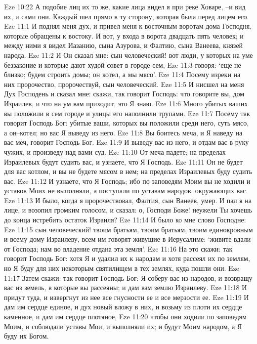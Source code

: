Eze 10:22  А подобие лиц их то же, какие лица видел я при реке Ховаре, --и вид их, и сами они. Каждый шел прямо в ту сторону, которая была перед лицем его.
Eze 11:1  И поднял меня дух, и привел меня к восточным воротам дома Господня, которые обращены к востоку. И вот, у входа в ворота двадцать пять человек; и между ними я видел Иазанию, сына Азурова, и Фалтию, сына Ванеева, князей народа.
Eze 11:2  И Он сказал мне: сын человеческий! вот люди, у которых на уме беззаконие и которые дают худой совет в городе сем,
Eze 11:3  говоря: `еще не близко; будем строить домы; он котел, а мы мясо'.
Eze 11:4  Посему изреки на них пророчество, пророчествуй, сын человеческий.
Eze 11:5  И нисшел на меня Дух Господень и сказал мне: скажи, так говорит Господь: что говорите вы, дом Израилев, и что на ум вам приходит, это Я знаю.
Eze 11:6  Много убитых ваших вы положили в сем городе и улицы его наполнили трупами.
Eze 11:7  Посему так говорит Господь Бог: убитые ваши, которых вы положили среди него, суть мясо, а он--котел; но вас Я выведу из него.
Eze 11:8  Вы боитесь меча, и Я наведу на вас меч, говорит Господь Бог.
Eze 11:9  И выведу вас из него, и отдам вас в руку чужих, и произведу над вами суд.
Eze 11:10  От меча падете; на пределах Израилевых будут судить вас, и узнаете, что Я Господь.
Eze 11:11  Он не будет для вас котлом, и вы не будете мясом в нем; на пределах Израилевых буду судить вас.
Eze 11:12  И узнаете, что Я Господь; ибо по заповедям Моим вы не ходили и уставов Моих не выполняли, а поступали по уставам народов, окружающих вас.
Eze 11:13  И было, когда я пророчествовал, Фалтия, сын Ванеев, умер. И пал я на лице, и возопил громким голосом, и сказал: о, Господи Боже! неужели Ты хочешь до конца истребить остаток Израиля?
Eze 11:14  И было ко мне слово Господне:
Eze 11:15  сын человеческий! твоим братьям, твоим братьям, твоим единокровным и всему дому Израилеву, всем им говорят живущие в Иерусалиме: `живите вдали от Господа; нам во владение отдана эта земля'.
Eze 11:16  На это скажи: так говорит Господь Бог: хотя Я и удалил их к народам и хотя рассеял их по землям, но Я буду для них некоторым святилищем в тех землях, куда пошли они.
Eze 11:17  Затем скажи: так говорит Господь Бог: Я соберу вас из народов, и возвращу вас из земель, в которые вы рассеяны; и дам вам землю Израилеву.
Eze 11:18  И придут туда, и извергнут из нее все гнусности ее и все мерзости ее.
Eze 11:19  И дам им сердце единое, и дух новый вложу в них, и возьму из плоти их сердце каменное, и дам им сердце плотяное,
Eze 11:20  чтобы они ходили по заповедям Моим, и соблюдали уставы Мои, и выполняли их; и будут Моим народом, а Я буду их Богом.
